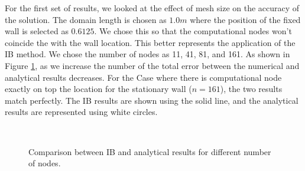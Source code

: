 For the first set of results, we looked at the effect of mesh size on the accuracy of the solution. The domain length is chosen as $1.0 m$ where the position of the fixed wall is selected as $0.6125$. We chose this so that the computational nodes won't coincide the with the wall location. This better represents the application of the IB method. We chose the number of nodes as 11, 41, 81, and 161. As shown in Figure \ref{fig:C3_penalizationResultNodeNumber}, as we increase the number of the total error between the numerical and analytical results decreases. For the Case where there is computational node exactly on top the location for the stationary wall ($n=161$), the two results match perfectly. The IB results are shown using the solid line, and the analytical results are represented using white circles.

\begin{figure}[H]
    \centering
    \quad
    \\
    \quad
    \caption{Comparison between IB and analytical results for different number of nodes.}
    \label{fig:C3_penalizationResultNodeNumber}
\end{figure}

